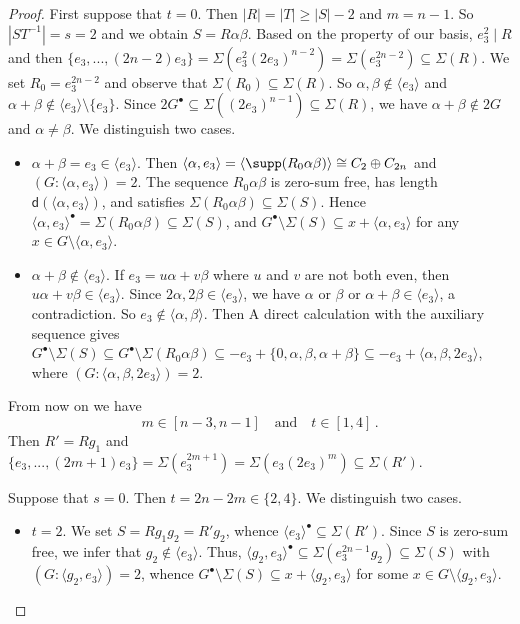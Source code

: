 \documentclass[a4paper, 10pt]{amsart}
\theoremstyle{plain}
\theoremstyle{definition}
\numberwithin{equation}{section}
\begin{document}
{\begin{proof}
  	
  First suppose that  $t=0$. Then $|R|= |T|\ge |S|-2$  and $m= n-1$. So $|ST^{-1}|=s=2$ and 
	  we obtain $S = R \alpha \beta$. Based on the property of our basis, $e_3^2\mid R$ and then $\{e_3,...,(2n-2)e_3\}=\Sigma(e_3^2 (2e_3)^{n-2}) =\Sigma(e_3^{2n-2})\subseteq \Sigma(R)$. We set $R_0=e_3^{2n-2}$ and observe that $\Sigma(R_0)\subseteq\Sigma(R)$. So $\alpha, \beta\notin \langle e_3\rangle$ and $\alpha +\beta\notin \langle e_3\rangle \setminus \{e_3\}$.  Since $2G^{\bullet} \subseteq \Sigma((2e_3)^{n-1}) \subseteq \Sigma(R)$, we have $\alpha +\beta\notin 2G$ and $\alpha \ne \beta$. We distinguish two cases.
  \begin{itemize}
	  	\item[(i)] $\alpha+\beta=e_3\in\langle e_3\rangle$. Then $\langle\alpha,e_3\rangle=\langle\supp(R_0\alpha\beta)\rangle\cong C_2\oplus C_{2n}$ and $(G:\langle\alpha,e_3\rangle)=2$. The sequence $R_0\alpha\beta$ is zero-sum free, has length $\mathsf d(\langle\alpha,e_3\rangle)$, and satisfies $\Sigma(R_0\alpha\beta)\subseteq\Sigma(S)$. Hence $\langle\alpha,e_3\rangle^{\bullet}=\Sigma(R_0\alpha\beta)\subseteq\Sigma(S)$, and $G^{\bullet}\setminus\Sigma(S)\subseteq x+\langle\alpha,e_3\rangle$ for any $x\in G\setminus\langle\alpha,e_3\rangle$.
  	
  	\item[(ii)] $\alpha +\beta\notin \langle e_3\rangle $. If $e_3=u\alpha+v\beta$ where $u$ and $v$ are not both even, then $u\alpha+v\beta\in \langle e_3\rangle$. Since $2\alpha,2\beta\in \langle e_3\rangle$, we have $\alpha$ or $\beta$ or $\alpha+\beta\in \langle e_3\rangle$, a contradiction. So $e_3\notin \langle \alpha ,\beta\rangle$. Then
	  A direct calculation with the auxiliary sequence gives
		$G^{\bullet}\setminus\Sigma(S)\subseteq G^{\bullet}\setminus\Sigma(R_0\alpha\beta)\subseteq-e_3+\{0,\alpha,\beta,\alpha+\beta\}\subseteq-e_3+\langle\alpha,\beta,2e_3\rangle$, where $(G:\langle\alpha,\beta,2e_3\rangle)=2$.
  \end{itemize}
  
 
 \smallskip
From now on we have
\begin{equation}
m\in[n-3,n-1] \quad \text{and} \quad t \in [1, 4] \,. 
\end{equation}
Then $R'=Rg_1$ and  $ \{e_3,...,(2m+1)e_3\}=\Sigma(e_3^{2m+1})=\Sigma(e_3 (2e_3)^{m}) \subseteq \Sigma(R')$. 

Suppose that $s=0$. Then $t=2n-2m\in \{2,4\}$. We distinguish two cases.
\begin{itemize}
\item[(i)] $t=2$. We set $S = R g_1 g_2=R'g_2$, whence $\langle e_3\rangle^{\bullet}\subseteq \Sigma (R')$. 
	Since $S$ is zero-sum free, we infer that $g_2\notin \langle e_3\rangle$. Thus, 
	$\langle g_2,e_3 \rangle^{\bullet}\subseteq \Sigma (e_3^{2n-1} g_2)\subseteq \Sigma (S)$ with $(G: \langle g_2, e_3 \rangle)=2$, whence  $G^{\bullet} \setminus \Sigma (S) \subseteq x + \langle g_2, e_3 \rangle$ for some $x \in G \setminus \langle g_2, e_3 \rangle$.
	

\end{itemize}
\end{proof}}
\end{document}
